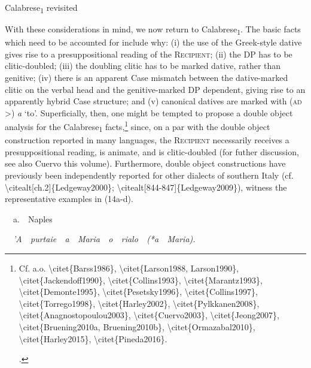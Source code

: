 \documentclass[output=paper,modfonts,nonflat]{langsci/langscibook}
\begin{document}
\begin{listWWNumxileveli}
\item 
\begin{stylelsSectioni}
Calabrese\textsubscript{1} revisited
\end{stylelsSectioni}
\end{listWWNumxileveli}
\begin{styleStandard}
With these considerations in mind, we now return to Calabrese\textsubscript{1}. The basic facts which need to be accounted for include why: (i) the use of the Greek-style dative gives rise to a presuppositional reading of the \textsc{Recipient}; (ii) the DP has to be clitic-doubled; (iii) the doubling clitic has to be marked dative, rather than genitive; (iv) there is an apparent Case mismatch between the dative-marked clitic on the verbal head and the genitive-marked DP dependent, giving rise to an apparently hybrid Case structure; and (v) canonical datives are marked with (\textsc{ad} {\textgreater}) \textit{a }‘to’. Superficially, then, one might be tempted to propose a double object analysis for the Calabrese\textsubscript{1} facts,\footnote{ Cf. a.o. {\textbackslash}citet\{Barss1986\}, {\textbackslash}citet\{Larson1988, Larson1990\}, {\textbackslash}citet\{Jackendoff1990\}, {\textbackslash}citet\{Collins1993\}, {\textbackslash}citet\{Marantz1993\}, {\textbackslash}citet\{Demonte1995\}, {\textbackslash}citet\{Pesetsky1996\}, {\textbackslash}citet\{Collins1997\}, {\textbackslash}citet\{Torrego1998\}, {\textbackslash}citet\{Harley2002\}, {\textbackslash}citet\{Pylkkanen2008\}, {\textbackslash}citet\{Anagnostopoulou2003\}, {\textbackslash}citet\{Cuervo2003\}, {\textbackslash}citet\{Jeong2007\}, {\textbackslash}citet\{Bruening2010a, Bruening2010b\}, {\textbackslash}citet\{Ormazabal2010\}, {\textbackslash}citet\{Harley2015\}, {\textbackslash}citet\{Pineda2016\}.\par .} since, on a par with the double object construction reported in many languages, the \textsc{Recipient} necessarily receives a presuppositional reading, is animate, and is clitic-doubled (for futher discussion, see also Cuervo this volume). Furthermore, double object constructions have previously been independently reported for other dialects of southern Italy (cf. {\textbackslash}citealt[ch.2]\{Ledgeway2000\}; {\textbackslash}citealt[844-847]\{Ledgeway2009\}), witness the representative examples in (14a-d). 
\end{styleStandard}


\setcounter{listWWNumviiileveli}{0}
\begin{listWWNumviiileveli}
\item 
\begin{styleListParagraph}
\ \ a.\ \ Naples
\end{styleListParagraph}
\end{listWWNumviiileveli}
\begin{styleListParagraph}
\ \ \textit{’A\ \ purtaie\ \ a\ \ Maria\ \ o\ \ rialo\ \ (*a\ \ Maria).}
\end{styleListParagraph}
\end{document}
